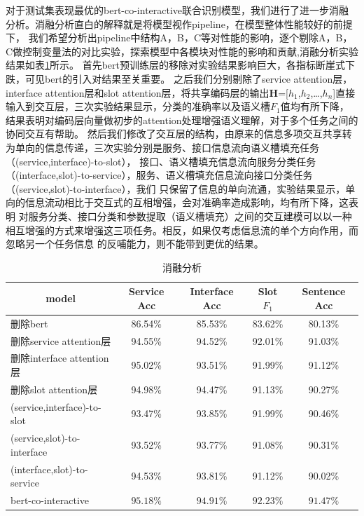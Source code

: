 对于测试集表现最优的bert-co-interactive联合识别模型，我们进行了进一步消融分析。消融分析直白的解释就是将模型视作pipeline，在模型整体性能较好的前提下，
我们希望分析出pipeline中结构A，B，C等对性能的影响，逐个剔除A，B，C做控制变量法的对比实验，探索模型中各模块对性能的影响和贡献,消融分析实验结果如表\ref{tab:xiaorongjieguo}所示。
首先bert预训练层的移除对实验结果影响巨大，各指标断崖式下跌，可见bert的引入对结果至关重要。
之后我们分别剔除了service attention层，interface attention层和slot attention层，将共享编码层的输出$\mathbf{H}$=[$h_{1}$,$h_{2}$,\dots,$h_{n}$]直接
输入到交互层，三次实验结果显示，分类的准确率以及语义槽$F_1$值均有所下降，结果表明对编码层向量做初步的attention处理增强语义理解，对于多个任务之间的协同交互有帮助。
然后我们修改了交互层的结构，由原来的信息多项交互共享转为单向的信息传递，三次实验分别是服务、接口信息流向语义槽填充任务（(service,interface)-to-slot），
接口、语义槽填充信息流向服务分类任务（(interface,slot)-to-service），服务、语义槽填充信息流向接口分类任务（(service,slot)-to-interface），我们
只保留了信息的单向流通，实验结果显示，单向的信息流动相比于交互式的互相增强，会对准确率造成影响，均有所下降，这表明
对服务分类、接口分类和参数提取（语义槽填充）之间的交互建模可以以一种相互增强的方式来增强这三项任务。相反，如果仅考虑信息流的单个方向作用，而忽略另一个任务信息
的反哺能力，则不能带到更优的结果。
\begin{table}[htb]
  \centering
  \caption{消融分析}
  \label{tab:xiaorongjieguo}
\begin{tabular}{l|cccc}
  \toprule
  \multicolumn{1}{c|}{\centering model}&Service Acc&Interface Acc&Slot $F_1$&Sentence Acc\\
 \hline
 删除bert&86.54\%&85.53\%&83.62\%&80.13\%\\
 删除service attention层&94.55\%&94.52\%&92.01\%&91.03\%\\
 删除interface attention层&95.02\%&93.51\%&91.99\%&91.12\%\\
 删除slot attention层&94.98\%&94.47\%&91.13\%&90.27\%\\
 (service,interface)-to-slot&93.47\%&93.85\%&91.99\%&90.46\%\\
 (service,slot)-to-interface&93.52\%&93.77\%&91.08\%&90.31\%\\
 (interface,slot)-to-service&94.53\%&93.81\%&91.12\%&90.02\%\\
 bert-co-interactive&$\mathbf{95.18\%}$&$\mathbf{94.91}\%$&$\mathbf{92.23}\%$&$\mathbf{91.47}\%$\\
\bottomrule
\end{tabular}
\end{table}

